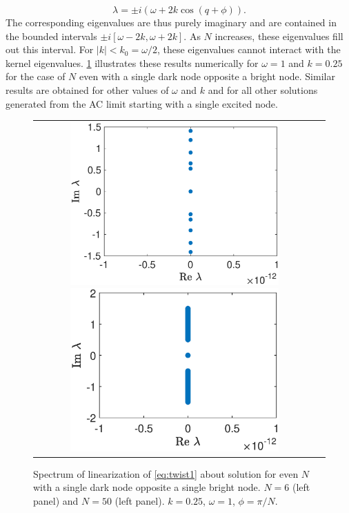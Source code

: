 \documentclass[12pt]{article}
\begin{document}
\begin{equation}\label{eq:dispersion}
\lambda = \pm i \left( \omega + 2 k \cos(q + \phi) \right).
\end{equation}
The corresponding eigenvalues are thus purely imaginary and are contained in the bounded intervals $\pm i[\omega - 2 k, \omega + 2 k]$. As $N$ increases, these eigenvalues fill out this interval. For $|k| < k_0 = \omega/2$, these eigenvalues cannot interact with the kernel eigenvalues. \cref{fig:evenholespec} illustrates these results numerically for $\omega = 1$ and $k = 0.25$ for the case of $N$ even with a single dark node opposite a bright node. Similar results are obtained for other values of $\omega$ and $k$ and for all other solutions generated from the AC limit starting with a single excited node.
\begin{figure}[H]
\begin{center}
\begin{tabular}{cc}
\includegraphics[width=8cm]{images/evenhole6spec.eps}
\includegraphics[width=8cm]{images/evenhole50spec.eps}
\end{tabular}
\end{center}
\caption{Spectrum of linearization of \cref{eq:twist1} about solution for even $N$ with a single dark node opposite a single bright node. $N=6$ (left panel) and $N=50$ (left panel). $k=0.25$, $\omega = 1$, $\phi = \pi/N$.}
\label{fig:evenholespec}
\end{figure}
\end{document}
